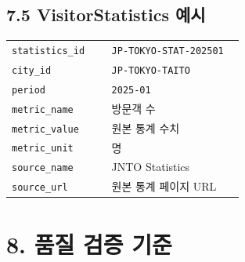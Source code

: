 \documentclass[12pt,a4paper]{article}
\newcommand{\DocNeedspace}[1]{\par\ifdim\dimexpr\pagegoal-\pagetotal\relax<#1\newpage\fi}
\newcommand{\TocNoChildTight}{\vspace{-0.28em}}
\begin{document}
\DocNeedspace{24\baselineskip}
\subsection*{7.5 VisitorStatistics 예시}


\DocNeedspace{22\baselineskip}
\begin{small}
\begin{longtable}{@{}>{\RaggedRight\arraybackslash}m{0.409\linewidth}>{\RaggedRight\arraybackslash}m{0.531\linewidth}@{}}
\toprule
\multicolumn{1}{>{\centering\arraybackslash}m{0.409\linewidth}}{\textbf{필드}} & \multicolumn{1}{>{\centering\arraybackslash}m{0.531\linewidth}}{\textbf{예시}} \\
\midrule
\endhead
\texttt{statistics\_\allowbreak{}id} & \texttt{JP-\allowbreak{}TOKYO-\allowbreak{}STAT-\allowbreak{}202501} \\
\texttt{city\_\allowbreak{}id} & \texttt{JP-\allowbreak{}TOKYO-\allowbreak{}TAITO} \\
\texttt{period} & \texttt{2025-\allowbreak{}01} \\
\texttt{metric\_\allowbreak{}name} & 방문객 수 \\
\texttt{metric\_\allowbreak{}value} & 원본 통계 수치 \\
\texttt{metric\_\allowbreak{}unit} & 명 \\
\texttt{source\_\allowbreak{}name} & JNTO Statistics \\
\texttt{source\_\allowbreak{}url} & 원본 통계 페이지 URL \\
\bottomrule
\end{longtable}
\end{small}


\newpage

\DocNeedspace{10\baselineskip}
\section*{8. 품질 검증 기준}
\addtocontents{toc}{\protect\TocNoChildTight}
\end{document}
